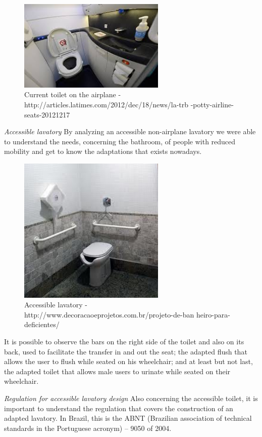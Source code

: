 \begin{figure}[h]
\centering
\includegraphics[width=7cm]{brazil_images/image012.jpg}
\caption{Current toilet on the airplane - http://articles.latimes.com/2012/dec/18/news/la-trb
-potty-airline-seats-20121217}
\label{fig:current_toilet}
\end{figure}

\emph{Accessible lavatory} By analyzing an accessible non-airplane lavatory we were able to understand the needs, concerning the bathroom, of people with reduced mobility and get to know the adaptations that exists nowadays.

\begin{figure}[h]
\centering
\includegraphics[width=7cm]{brazil_images/image013.jpg}
\caption{Accessible lavatory - 
http://www.decoracaoeprojetos.com.br/projeto-de-ban
heiro-para-deficientes/}
\label{fig:accessible_lavatory}
\end{figure}


It is possible to observe the bars on the right side of the toilet and also on its back, used to facilitate the transfer in and out the seat; the adapted flush that allows the user to flush while seated on his wheelchair; and at least but not last, the adapted toilet that allows male users to urinate while seated on their wheelchair.

\emph{Regulation for accessible lavatory design} Also concerning the accessible toilet, it is important to understand the regulation that covers the construction of an adapted lavatory. In Brazil, this is the ABNT (Brazilian association of technical standards in the Portuguese acronym) – 9050 of 2004.

